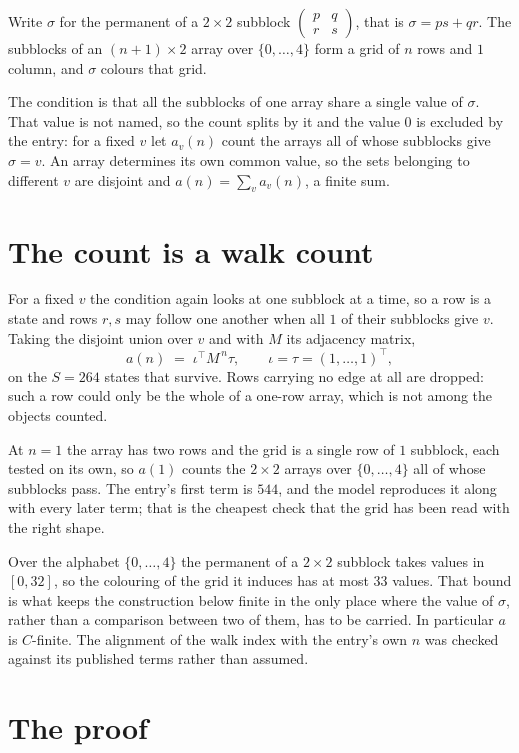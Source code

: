 \documentclass[11pt,a4paper]{article}
\theoremstyle{plain}
\theoremstyle{definition}
\begin{document}
Write $\sigma$ for the permanent of a $2\times2$ subblock
$\begin{pmatrix}p&q\\r&s\end{pmatrix}$, that is $\sigma=ps+qr$. The subblocks of an
$(n+1)\times2$ array over $\{0,\dots,4\}$ form a grid of $n$ rows and $1$
column, and $\sigma$ colours that grid.

The condition is that all the subblocks of one array share a single value of $\sigma$. That
value is not named, so the count splits by it and the value $0$ is excluded by the entry: for a fixed $v$ let $a_v(n)$ count the
arrays all of whose subblocks give $\sigma=v$. An array determines its own common value, so
the sets belonging to different $v$ are disjoint and $a(n)=\sum_v a_v(n)$, a finite sum.

\section{The count is a walk count}

For a fixed $v$ the condition again looks at one subblock at a time, so a
row is a state and rows $r,s$ may follow one another when all $1$ of their subblocks give
$v$. Taking the disjoint union over $v$ and with $M$ its adjacency matrix,
\[
a(n)\;=\;\iota^{\!\top}M^{\,n}\tau,\qquad\iota=\tau=(1,\dots,1)^{\!\top},
\]
on the $S=264$ states that survive. Rows carrying no edge at all are dropped: such a row could
only be the whole of a one-row array, which is not among the objects counted.

At $n=1$ the array has two rows and the grid is a single row of $1$
subblock, each tested on its own, so $a(1)$ counts the
$2\times2$ arrays over $\{0,\dots,4\}$ all of whose subblocks pass. The entry's
first term is $544$, and the model reproduces it along with every later term; that is the
cheapest check that the grid has been read with the right shape.

Over the alphabet $\{0,\dots,4\}$ the permanent of a $2\times2$ subblock takes values in
$[0,32]$, so the colouring of the grid it induces has at most $33$ values.
That bound is what keeps the construction below finite in the only place where the value of
$\sigma$, rather than a comparison between two of them, has to be carried.
In particular $a$ is $C$-finite. The alignment of the walk index with the entry's own $n$ was
checked against its published terms rather than assumed.

\section{The proof}
\end{document}

